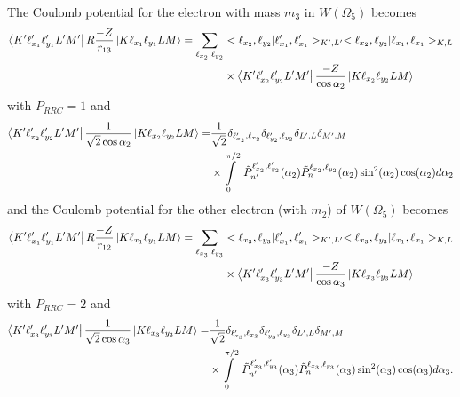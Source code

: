 The Coulomb potential for the electron with mass $m_3$ in $W(\Omega_5)$ becomes
\begin{align}
    \bra{K'\ell_{x_1}'\ell_{y_1}'L'M'} R\frac{-Z}{r_{13}} \ket{K \ell_{x_1} \ell_{y_1}LM} = \sum_{\ell_{x_2},\ell_{y_2}}& <\ell_{x_2},\ell_{y_2}|\ell_{x_1}',\ell_{x_1}'>_{K',L'} <\ell_{x_2},\ell_{y_2}|\ell_{x_1},\ell_{x_1}>_{K,L} \\
    &\times \bra{K'\ell_{x_2}'\ell_{y_2}'L'M'} \frac{-Z}{\cos\alpha_2} \ket{K\ell_{x_2}\ell_{y_2}LM}
\end{align}
with $P_{RRC}=1$  and 
\begin{align}
    \bra{K'\ell_{x_2}'\ell_{y_2}'L'M'} \frac{1}{\sqrt{2}\cos\alpha_2} \ket{K \ell_{x_2} \ell_{y_2}LM} =& \frac{1}{\sqrt{2}} \delta_{\ell_{x_2}',\ell_{x_2}} \delta_{\ell_{y_2}',\ell_{y_2}} \delta_{L',L} \delta_{M',M} \\
    & \times \int\limits_0^{\pi/2}\ \tilde{P}^{\ell_{x_2}',\ell_{y_2}'}_{n'}(\alpha_2) \tilde{P}^{\ell_{x_2},\ell_{y_2}}_{n}(\alpha_2) \sin^2(\alpha_2) \cos(\alpha_2)d\alpha_2  
\end{align}
and the Coulomb potential for the other electron (with $m_2$) of $W(\Omega_5)$ becomes
\begin{align}
    \bra{K'\ell_{x_1}'\ell_{y_1}'L'M'} R\frac{-Z}{r_{12}} \ket{K \ell_{x_1} \ell_{y_1}LM} = \sum_{\ell_{x_3},\ell_{y_3}}& <\ell_{x_3},\ell_{y_3}|\ell_{x_1}',\ell_{x_1}'>_{K',L'} <\ell_{x_3},\ell_{y_3}|\ell_{x_1},\ell_{x_1}>_{K,L} \\
    &\times \bra{K'\ell_{x_3}'\ell_{y_3}'L'M'} \frac{-Z}{\cos\alpha_3} \ket{K\ell_{x_3}\ell_{y_3}LM}
\end{align}
with $P_{RRC}=2$  and 
\begin{align}
    \bra{K'\ell_{x_3}'\ell_{y_3}'L'M'} \frac{1}{\sqrt{2}\cos\alpha_3} \ket{K \ell_{x_3} \ell_{y_3}LM} =& \frac{1}{\sqrt{2}} \delta_{\ell_{x_3}',\ell_{x_3}} \delta_{\ell_{y_3}',\ell_{y_3}} \delta_{L',L} \delta_{M',M} \\
    & \times \int\limits_0^{\pi/2}\ \tilde{P}^{\ell_{x_3}',\ell_{y_3}'}_{n'}(\alpha_3) \tilde{P}^{\ell_{x_3},\ell_{y_3}}_{n}(\alpha_3) \sin^2(\alpha_3) \cos(\alpha_3)d\alpha_3.  
\end{align}

